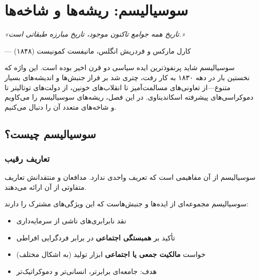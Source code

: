 
\chapter{سوسیالیسم: ریشه‌ها و شاخه‌ها}
\label{ch:socialism}

\begin{flushright}
\textit{«تاریخ همه جوامع تاکنون موجود، تاریخ مبارزه طبقاتی است.»}

— کارل مارکس و فردریش انگلس، مانیفست کمونیست (۱۸۴۸)
\end{flushright}


\lettrine[lines=3, lraise=0.1, nindent=0.5em]{\textcolor{LeftRed}{س}}{وسیالیسم} 
شاید پرنفوذترین ایده سیاسی دو قرن اخیر بوده است. این واژه که نخستین بار در دهه ۱۸۳۰ به کار رفت، چتری شد بر فراز جنبش‌ها و اندیشه‌های بسیار متنوع—از تعاونی‌های مسالمت‌آمیز تا انقلاب‌های خونین، از دولت‌های توتالیتر تا دموکراسی‌های پیشرفته اسکاندیناوی. در این فصل، ریشه‌های سوسیالیسم را می‌کاویم و شاخه‌های متعدد آن را دنبال می‌کنیم.

\section{سوسیالیسم چیست؟}

\subsection{تعاریف رقیب}

سوسیالیسم از آن مفاهیمی است که تعریف واحدی ندارد. مدافعان و منتقدانش تعاریف متفاوتی از آن ارائه می‌دهند.

\begin{defbox}
سوسیالیسم مجموعه‌ای از ایده‌ها و جنبش‌هاست که این ویژگی‌های مشترک را دارند:
\begin{itemize}[nosep]
    \item نقد نابرابری‌های ناشی از سرمایه‌داری
    \item تأکید بر \textbf{همبستگی اجتماعی} در برابر فردگرایی افراطی
    \item خواست \textbf{مالکیت جمعی یا اجتماعی} ابزار تولید (به اشکال مختلف)
    \item هدف: جامعه‌ای برابرتر، انسانی‌تر و دموکراتیک‌تر
\end{itemize}
\end{defbox}

